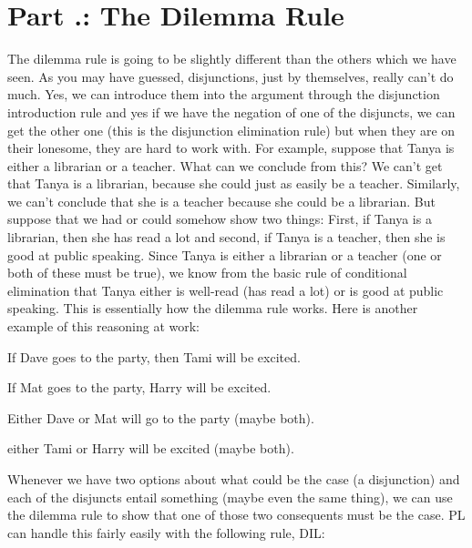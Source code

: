 \section{Part \thechapcount.\theseccount: The Dilemma Rule}
The dilemma rule is going to be slightly different than the others which we have seen. As you may have guessed, disjunctions, just by themselves, really can't do much. Yes, we can introduce them into the argument through the disjunction introduction rule and yes if we have the negation of one of the disjuncts, we can get the other one (this is the disjunction elimination rule) but when they are on their lonesome, they are hard to work with. For example, suppose that Tanya is either a librarian or a teacher. What can we conclude from this? We can't get that Tanya is a librarian, because she could just as easily be a teacher. Similarly, we can't conclude that she is a teacher because she could be a librarian. But suppose that we had or could somehow show two things: First, if Tanya is a librarian, then she has read a lot and second, if Tanya is a teacher, then she is good at public speaking. Since Tanya is either a librarian or a teacher (one or both of these must be true), we know from the basic rule of conditional elimination that Tanya either is well-read (has read a lot) or is good at public speaking. This is essentially how the dilemma rule works. Here is another example of this reasoning at work:

\begin{earg}
\item[]If Dave goes to the party, then Tami will be excited.
\item[]If Mat goes to the party, Harry will be excited.
\item[]Either Dave or Mat will go to the party (maybe both).
\item[\therefore] either Tami or Harry will be excited (maybe both).
\end{earg}

Whenever we have two options about what could be the case (a disjunction) and each of the disjuncts entail something (maybe even the same thing), we can use the dilemma rule to show that one of those two consequents must be the case. PL can handle this fairly easily with the following rule, DIL:


